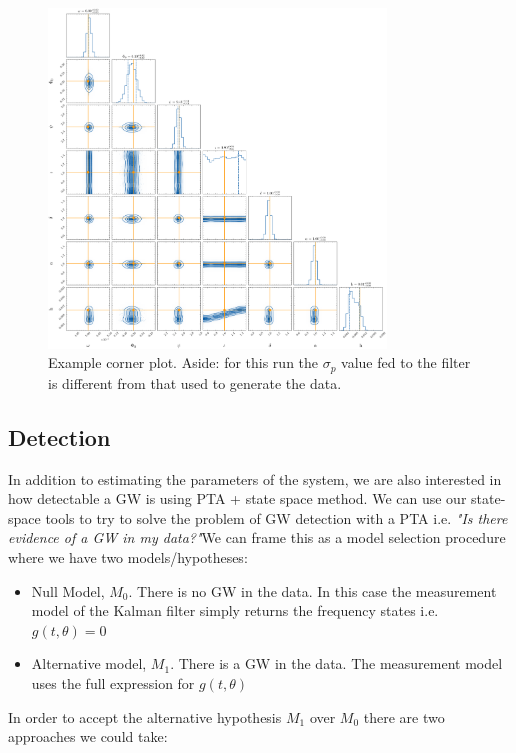 \documentclass[fleqn,usenatbib,useAMS]{mnras}
\begin{document}
\begin{figure}
	\includegraphics[width=0.8\textwidth]{images/canonical_example}
	\caption{Example corner plot. Aside: for this run the $\sigma_p$ value fed to the filter is different from that used to generate the data.}
	\label{fig:corner2}
\end{figure}

\subsection{Detection}\label{sec:detection}

In addition to estimating the parameters of the system, we are also interested in how detectable a GW is using PTA + state space method. We can use our state-space tools  to try to solve the problem of GW detection with a PTA i.e. \textit{"Is there evidence of a GW in my data?"}We can frame this as a model selection procedure where we have two models/hypotheses:

\begin{itemize}
\item Null Model, $M_0$. There is no GW in the data. In this case the measurement model of the Kalman filter simply returns the frequency states i.e. $g(t,\theta)= 0$
\item Alternative model, $M_1$. There is a GW in the data. The measurement model uses the full expression for $g(t,\theta)$
\end{itemize}



In order to accept the alternative hypothesis $M_1$ over $M_0$ there are two approaches we could take:
\end{document}
